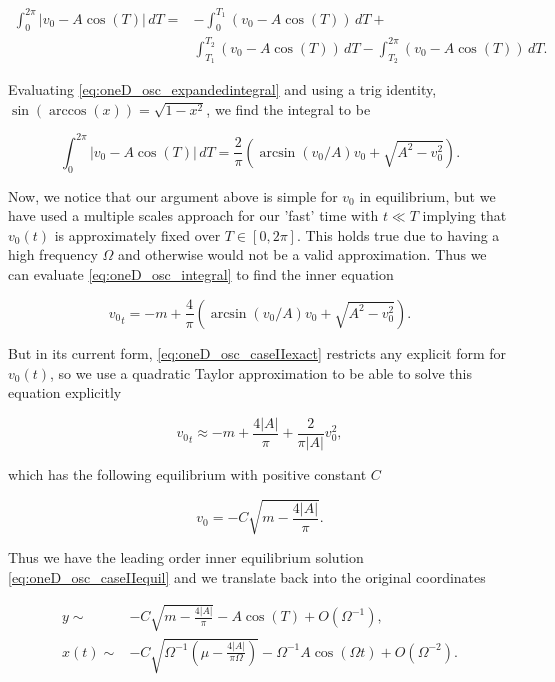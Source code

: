 \begin{equation}\label{eq:oneD_osc_expandedintegral}
\begin{aligned}
\int_0^{2\pi}|v_0-A\cos(T)|\,dT=&-\int_0^{T_1}(v_0-A\cos(T))\,dT+\\
&\int_{T_1}^{T_2}(v_0-A\cos(T))\,dT-\int_{T_2}^{2\pi}(v_0-A\cos(T))\,dT.
\end{aligned}
\end{equation}

Evaluating \eqref{eq:oneD_osc_expandedintegral} and using a trig identity, $\sin(\arccos(x))=\sqrt{1-x^2}$, we find the integral to be

\begin{equation*}
\int_0^{2\pi}|v_0-A\cos(T)|\,dT=\frac{2}{\pi}\left(\arcsin(v_0/A)v_0+\sqrt{A^2-v_0^2}\right).
\end{equation*}

Now, we notice that our argument above is simple for $v_0$ in equilibrium, but we have used a multiple scales approach for our 'fast' time with $t\ll T$ implying that $v_0(t)$ is approximately fixed over $T\in [0,2\pi]$. This holds true due to having a high frequency $\Omega$ and otherwise would not be a valid approximation. Thus we can evaluate \eqref{eq:oneD_osc_integral} to find the inner equation 

\begin{equation}\label{eq:oneD_osc_caseIIexact}
{v_0}_t=-m+\frac{4}{\pi}\left(\arcsin(v_0/A)v_0+\sqrt{A^2-v_0^2}\right).
\end{equation}

But in its current form, \eqref{eq:oneD_osc_caseIIexact} restricts any explicit form for $v_0(t)$, so we use a quadratic Taylor approximation to be able to solve this equation explicitly

\begin{equation}\label{eq:oneD_osc_caseIItaylor}
{v_0}_t \approx -m + \frac{4|A|}{\pi} + \frac{2}{\pi |A|}v_0^2,
\end{equation}

which has the following equilibrium with positive constant $C$

\begin{equation}\label{eq:oneD_osc_caseIIequil}
v_0=-C\sqrt{m-\frac{4|A|}{\pi}}.
\end{equation}

Thus we have the leading order inner equilibrium solution \eqref{eq:oneD_osc_caseIIequil} and we translate back into the original coordinates

\begin{equation}\label{eq:oneD_osc_innersoln}
\begin{aligned}
y\sim& -C\sqrt{m-\frac{4|A|}{\pi}}-A\cos(T)+O(\Omega^{-1}),\\ 
x(t)\sim& -C\sqrt{\Omega^{-1} \left(\mu-\frac{4|A|}{\pi \Omega}\right)}-\Omega^{-1} A\cos(\Omega t)+O(\Omega^{-2}).
\end{aligned}
\end{equation}

